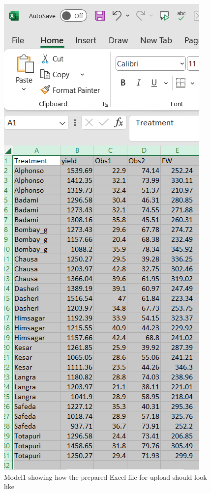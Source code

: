 \documentclass[
  letterpaper,
  DIV=11,
  numbers=noendperiod]{scrartcl}
\begin{document}
\begin{figure}

{\centering \includegraphics{P1.webp}

}

\caption{\label{fig-1}Model1 showing how the prepared Excel file for
upload should look like}

\end{figure}
\end{document}
